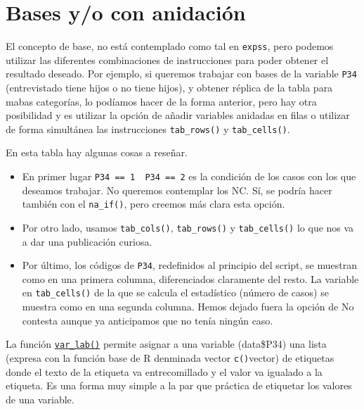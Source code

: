 \documentclass[
]{book}
\providecommand{\tightlist}{%
  \setlength{\itemsep}{0pt}\setlength{\parskip}{0pt}}
\begin{document}
\hypertarget{bases-yo-con-anidaciuxf3n}{%
\section{Bases y/o con anidación}\label{bases-yo-con-anidaciuxf3n}}

El concepto de base, no está contemplado como tal en \texttt{expss}, pero podemos utilizar las diferentes combinaciones de instrucciones para poder obtener el resultado deseado. Por ejemplo, si queremos trabajar con bases de la variable \texttt{P34} (entrevistado tiene hijos o no tiene hijos), y obtener réplica de la tabla para mabas categorías, lo podíamos hacer de la forma anterior, pero hay otra posibilidad y es utilizar la opción de añadir variables anidadas en filas o utilizar de forma simultánea las instrucciones \texttt{tab\_rows()} y \texttt{tab\_cells()}.

En esta tabla hay algunas cosas a reseñar.

\begin{itemize}
\tightlist
\item
  En primer lugar \texttt{P34\ ==\ 1\ \textbar{}\ P34\ ==\ 2} es la condición de los casos con los que deseamos trabajar. No queremos contemplar los NC. Sí, se podría hacer también con el \texttt{na\_if()}, pero creemos más clara esta opción.
\item
  Por otro lado, usamos \texttt{tab\_cols()}, \texttt{tab\_rows()} y \texttt{tab\_cells()} lo que nos va a dar una publicación curiosa.
\item
  Por último, los códigos de \texttt{P34}, redefinidos al principio del script, se muestran como en una primera columna, diferenciados claramente del resto. La variable en \texttt{tab\_cells()} de la que se calcula el estadístico (número de casos) se muestra como en una segunda columna. Hemos dejado fuera la opción de No contesta aunque ya anticipamos que no tenía ningún caso.
\end{itemize}

La función \href{https://rdrr.io/cran/expss/man/var_lab.html}{\texttt{var\_lab()}} permite asignar a una variable (data\$P34) una lista (expresa con la función base de R denminada vector \texttt{c()}vector) de etiquetas donde el texto de la etiqueta va entrecomillado y el valor va igualado a la etiqueta. Es una forma muy simple a la par que práctica de etiquetar los valores de una variable.
\end{document}
